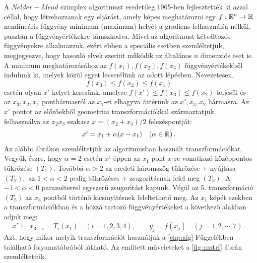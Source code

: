 \documentclass[oneside,titlepage,12pt,a4paper]{report}
\begin{document}
A $Nelder-Mead$ szimplex algoritmust \cite{NelderMeadSimplex} eredetileg 1965-ben
fejlesztett\'ek ki azzal c\'ellal, hogy l\'etrehozzanak egy elj\'ar\'ast, amely
k\'epes meghat\'arozni egy $f : \Bbb R^n \to \Bbb R$ nemline\'aris f\"uggv\'eny minimum (maximum) hely\'et a  gradiens felhaszn\'al\'sa  n\'elk\"ul, puszt\'an a f\"uggv\'eny\'ert\'ekekre  t\'amszkodva.
Mivel az algoritmust k\'etv\'altoz\'os f\"uggv\'enyekre alkalmazzuk, ez\'ert ebben a speci\'alis esetben szeml\'eltetj\"uk, megjegyezve, hogy hasonl\'o elvek szerint
 m\H uk\"odik az \'altal\'anos $n$ dimenziós eset is. A minimum meghat\'aroz\'a\-s\'ahoz az $f(x_1), f(x_2), f(x_3)$  függvényértékekből indulunk ki, melyek közül egyet lecserélünk az adott lépésben. Nevezetesen, 
\begin{equation*}
f(x_3)\le f(x_2)\le f(x_1)
\end{equation*}
 eset\'en olyan $x'$ helyet keres\"unk, amelyre $f(x')\le  f(x_3)\le f(x_2)$ teljes\"ul \'es az $x_3, x_2, x_1$ ponth\'armasr\'ol az $x_1$-et elhagyva \'att\'er\"unk az $x',x_3, x_2$ h\'armasra. Az $x'$ pontot az el\H oz\H oekb\H ol geometriai transzform\'aci\'okkal sz\'armaztatjuk, felhaszn\'alva az  $x_2x_3$ szakasz $x=(x_2+x_3)/2$ felez\'espontj\'at: 
\begin{equation*}
x'=x_1+\alpha (x-x_1) \quad (\alpha\in\Bbb R)\,.
\end{equation*}
 Az al\'abbi \'abr\'akon szeml\'eltetj\"uk az algoritmusban  haszn\'alt transzform\'aci\'okat. Vegyük észre, hogy $\alpha=2$ esetén $x'$ éppen az $x_1$ pont $x$-re vonatkozó középpontos tükrözése $(T_1).$ Továbbá $\alpha>2$ az eredeti háromszög t\"ukr\"oz\'ese + ny\'ujt\'asa $(T_2),$ az $1<\alpha<2$ pedig t\"ukr\"oz\'eses + zsugor\'\i t\'asnak felel meg $(T_3).$ A $-1<\alpha<0$ param\'eterrel egyszerű zsugor\'\i t\'ast kapunk. V\'eg\"ul az 5. transzform\'aci\'o $(T_5)$ az $x_3$ pontb\'ol t\"ort\'en\H o
 kicsiny\'\i t\'esnek feleltethető meg. Az $x_1$ k\'ep\'et ezekben a transzform\'aci\'okban \'es a hozzá tartoz\'o f\"uggv\'eny\'ert\'ekeket a következő alakban adjuk meg:
\begin{equation*}
x':=x_{3+i}=T_i(x_1)\quad (i=1,2,3,4), \qquad y_j=f(x_j)\quad (j=1,2,\cdots,7)\,.
\end{equation*}
Azt, hogy mikor melyik transzform\'aci\'ot haszn\'aljuk a \ref{chp:alg} F\"uggel\'ekben
tal\'alhat\'o  folyamat\'abr\'ab\'ol l\'athat\'o. Az említett műveleteket a \ref{fig:nmtrf} ábrán szemléltettük.
\end{document}
